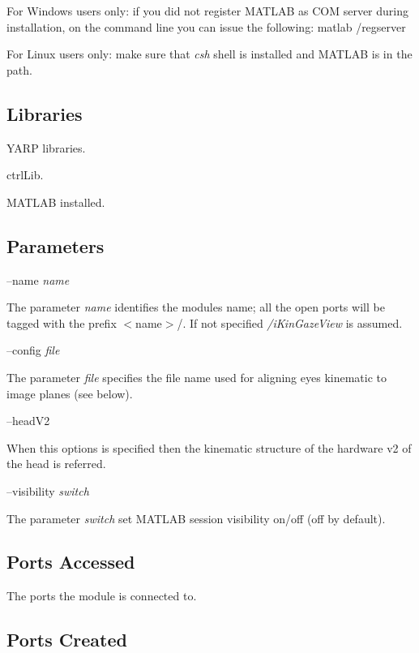 For Windows users only\+: if you did not register M\+A\+T\+L\+AB as C\+OM server during installation, on the command line you can issue the following\+: matlab /regserver

For Linux users only\+: make sure that {\itshape csh} shell is installed and M\+A\+T\+L\+AB is in the path.\hypertarget{group__icub__signalScope_lib_sec}{}\subsection{Libraries}\label{group__icub__signalScope_lib_sec}

\begin{DoxyItemize}
\item Y\+A\+RP libraries.
\item ctrl\+Lib.
\item M\+A\+T\+L\+AB installed.
\end{DoxyItemize}\hypertarget{group__icub__signalScope_parameters_sec}{}\subsection{Parameters}\label{group__icub__signalScope_parameters_sec}
--name {\itshape name} 
\begin{DoxyItemize}
\item The parameter {\itshape name} identifies the module\textquotesingle{}s name; all the open ports will be tagged with the prefix $<$name$>$/. If not specified {\itshape /i\+Kin\+Gaze\+View} is assumed.
\end{DoxyItemize}

--config {\itshape file} 
\begin{DoxyItemize}
\item The parameter {\itshape file} specifies the file name used for aligning eyes kinematic to image planes (see below).
\end{DoxyItemize}

--head\+V2
\begin{DoxyItemize}
\item When this options is specified then the kinematic structure of the hardware v2 of the head is referred.
\end{DoxyItemize}

--visibility {\itshape switch} 
\begin{DoxyItemize}
\item The parameter {\itshape switch} set M\+A\+T\+L\+AB session visibility on/off (off by default).
\end{DoxyItemize}\hypertarget{group__icub__signalScope_portsa_sec}{}\subsection{Ports Accessed}\label{group__icub__signalScope_portsa_sec}
The ports the module is connected to.\hypertarget{group__icub__signalScope_portsc_sec}{}\subsection{Ports Created}\label{group__icub__signalScope_portsc_sec}

